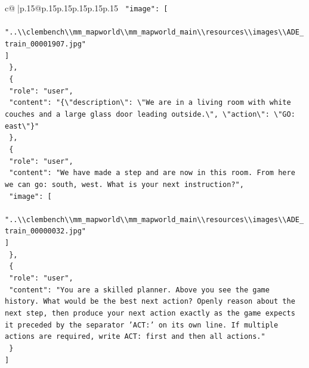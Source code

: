 \documentclass{article}
\begin{document}
{\begin{supertabular}{c@{$\;$}|p{.15\linewidth}@{}p{.15\linewidth}p{.15\linewidth}p{.15\linewidth}p{.15\linewidth}p{.15\linewidth}}
{{{\texttt{    "image": {[}} \\
\texttt{      "..\textbackslash{}\textbackslash{}clembench\textbackslash{}\textbackslash{}mm\_mapworld\textbackslash{}\textbackslash{}mm\_mapworld\_main\textbackslash{}\textbackslash{}resources\textbackslash{}\textbackslash{}images\textbackslash{}\textbackslash{}ADE\_train\_00001907.jpg"} \\
\texttt{    {]}} \\
\texttt{  \},} \\
\texttt{  \{} \\
\texttt{    "role": "user",} \\
\texttt{    "content": "\{\textbackslash{}"description\textbackslash{}": \textbackslash{}"We are in a living room with white couches and a large glass door leading outside.\textbackslash{}", \textbackslash{}"action\textbackslash{}": \textbackslash{}"GO: east\textbackslash{}"\}"} \\
\texttt{  \},} \\
\texttt{  \{} \\
\texttt{    "role": "user",} \\
\texttt{    "content": "We have made a step and are now in this room. From here we can go: south, west. What is your next instruction?",} \\
\texttt{    "image": {[}} \\
\texttt{      "..\textbackslash{}\textbackslash{}clembench\textbackslash{}\textbackslash{}mm\_mapworld\textbackslash{}\textbackslash{}mm\_mapworld\_main\textbackslash{}\textbackslash{}resources\textbackslash{}\textbackslash{}images\textbackslash{}\textbackslash{}ADE\_train\_00000032.jpg"} \\
\texttt{    {]}} \\
\texttt{  \},} \\
\texttt{  \{} \\
\texttt{    "role": "user",} \\
\texttt{    "content": "You are a skilled planner. Above you see the game history. What would be the best next action? Openly reason about the next step, then produce your next action exactly as the game expects it preceded by the separator 'ACT:' on its own line. If multiple actions are required, write ACT: first and then all actions."} \\
\texttt{  \}} \\
\texttt{{]}} \\
            }
        }
    }
     \\ \\


\end{supertabular}}
\end{document}
